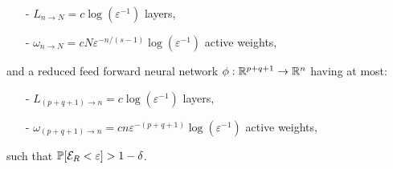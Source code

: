 \begin{theorem}
    \begin{enumerate}
        \item[-] $L_{n \to N} = c \log(\varepsilon^{-1})$ layers,
        \item[-] $\omega_{n \to N} = cN \varepsilon^{-n/(s-1)} \log(\varepsilon^{-1})$ active weights,
    \end{enumerate}
    and a reduced feed forward neural network $\phi: \mathbb{R}^{p+q+1} \to \mathbb{R}^n$ having at most:
    \begin{enumerate}
        \item[-] $L_{(p+q+1) \to n} = c \log(\varepsilon^{-1})$ layers,
        \item[-] $\omega_{(p+q+1) \to n} = cn \varepsilon^{-(p+q+1)} \log(\varepsilon^{-1})$ active weights,
    \end{enumerate}
    such that $\mathbb{P}[\mathcal{E}_R < \varepsilon] > 1 - \delta$.
\end{theorem}
